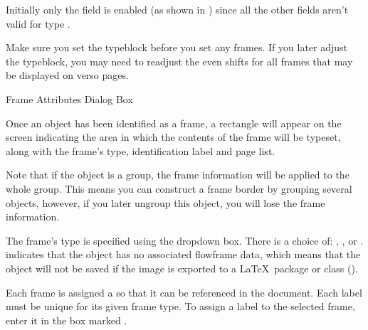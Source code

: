 
Initially only the  field
is enabled (as shown in ) since all the other
fields aren't valid for type .

\begin{warning}
Make sure you set the typeblock before you set any frames.
If you later adjust the typeblock, you may need to readjust the even
shifts for all frames that may be displayed on \gls{verso} pages.
\end{warning}

{}
{Frame Attributes Dialog Box}

Once an \gls*{object} has been identified as a frame, a
 rectangle will appear on the screen indicating the area in
which the contents of the frame will be typeset, along with the
frame's type, identification label and page list.

\begin{information}
Note that if the \gls*{object} is a \gls{group}, the frame
information will be applied to the whole group. This means you can
construct a frame border by grouping several objects, however, if
you later ungroup this \gls*{object}, you will lose the frame
information.
\end{information}


The frame's type is specified using the 
 dropdown box. There is a choice of:
, ,
 or .
 indicates that the \gls{object} has
no associated flowframe data, which means that the object will not
be saved if the image is exported to a \LaTeX\ package or
class ().


Each frame is assigned a  so that it can be referenced in the
document. Each label must be unique for its given frame type.  To
assign a label to the selected frame, enter it in the box
marked .

